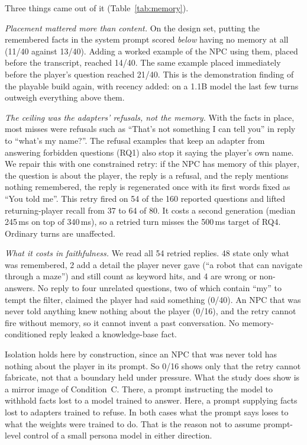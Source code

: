 \documentclass[conference]{IEEEtran}
\begin{document}
Three things came out of it (Table~\ref{tab:memory}).

\emph{Placement mattered more than content.} On the design set, putting the
remembered facts in the system prompt scored \emph{below} having no memory at
all (11/40 against 13/40). Adding a worked example of the NPC using them, placed
before the transcript, reached 14/40. The same example placed immediately before
the player's question reached 21/40. This is the demonstration finding of the
playable build again, with recency added: on a 1.1B model the last few turns
outweigh everything above them.

\emph{The ceiling was the adapters' refusals, not the memory.} With the facts in
place, most misses were refusals such as ``That's not something I can tell
you'' in reply to ``what's my name?''. The refusal examples that keep an
adapter from answering forbidden questions (RQ1) also stop it saying the
player's own name. We repair this with one constrained retry: if the NPC has
memory of this player, the question is about the player, the reply is a
refusal, and the reply mentions nothing remembered, the reply is regenerated
once with its first words fixed as ``You told me''. This retry fired on 54 of
the 160 reported questions and lifted returning-player recall from 37 to 64
of 80. It costs a second generation (median 245\,ms on top of 340\,ms), so a
retried turn misses the 500\,ms target of RQ4. Ordinary turns are unaffected.

\emph{What it costs in faithfulness.} We read all 54 retried replies. 48 state
only what was remembered, 2 add a detail the player never gave (``a robot that
can navigate through a maze'') and still count as keyword hits, and 4 are wrong
or non-answers. No reply to four unrelated questions, two of which contain
``my'' to tempt the filter, claimed the player had said something (0/40). An
NPC that was never told anything knew nothing about the player (0/16), and the
retry cannot fire without memory, so it cannot invent a past conversation. No
memory-conditioned reply leaked a knowledge-base fact.

Isolation holds here by construction, since an NPC that was never told has
nothing about the player in its prompt. So 0/16 shows only that the retry
cannot fabricate, not that a boundary held under pressure. What the study does
show is a mirror image of Condition~C. There, a prompt instructing the model to
withhold facts lost to a model trained to answer. Here, a prompt supplying facts
lost to adapters trained to refuse. In both cases what the prompt says loses to
what the weights were trained to do. That is the reason not to assume prompt-level
control of a small persona model in either direction.
\end{document}
